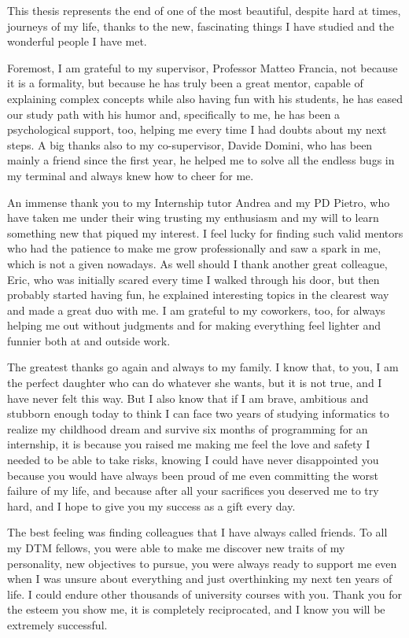 \documentclass[12pt,a4paper,openright,twoside]{book}
\begin{document}
\begin{acknowledgements} 
This thesis represents the end of one of the most beautiful, despite hard at times, journeys of my life, thanks to the new, fascinating things I have studied and the wonderful people I have met. 

Foremost, I am grateful to my supervisor, Professor Matteo Francia, not because it is a formality, but because he has truly been a great mentor, capable of explaining complex concepts while also having fun with his students, he has eased our study path with his humor and, specifically to me, he has been a psychological support, too, helping me every time I had doubts about my next steps. A big thanks also to my co-supervisor, Davide Domini, who has been mainly a friend since the first year, he helped me to solve all the endless bugs in my terminal and always knew how to cheer for me.

An immense thank you to my Internship tutor Andrea and my PD Pietro, who have taken me under their wing trusting my enthusiasm and my will to learn something new that piqued my interest. I feel lucky for finding such valid mentors who had the patience to make me grow professionally and saw a spark in me, which is not a given nowadays. As well should I thank another great colleague, Eric, who was initially scared every time I walked through his door, but then probably started having fun, he explained interesting topics in the clearest way and made a great duo with me. I am grateful to my coworkers, too, for always helping me out without judgments and for making everything feel lighter and funnier both at and outside work. 

The greatest thanks go again and always to my family. I know that, to you, I am the perfect daughter who can do whatever she wants, but it is not true, and I have never felt this way. But I also know that if I am brave, ambitious and stubborn enough today to think I can face two years of studying informatics to realize my childhood dream and survive six months of programming for an internship, it is because you raised me making me feel the love and safety I needed to be able to take risks, knowing I could have never disappointed you because you would have always been proud of me even committing the worst failure of my life, and because after all your sacrifices you deserved me to try hard, and I hope to give you my success as a gift every day.

The best feeling was finding colleagues that I have always called friends. To all my DTM fellows, you were able to make me discover new traits of my personality, new objectives to pursue, you were always ready to support me even when I was unsure about everything and just overthinking my next ten years of life. I could endure other thousands of university courses with you. Thank you for the esteem you show me, it is completely reciprocated, and I know you will be extremely successful.


\end{acknowledgements}
\end{document}
